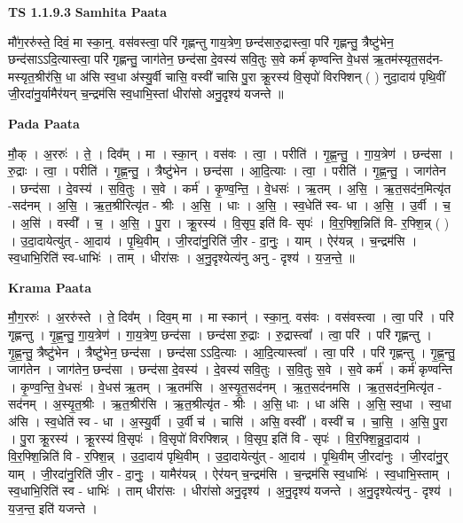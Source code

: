 \documentclass[17pt]{extarticle}
\begin{document}
\textbf{TS 1.1.9.3 } \newline
\textbf{Samhita Paata} \newline

मौ॑ग॒ररु॑स्ते॒ दिवं॒ मा स्का॒न्॒. वस॑वस्त्वा॒ परि॑ गृह्णन्तु गाय॒त्रेण॒ छन्द॑सारु॒द्रास्त्वा॒ परि॑ गृह्णन्तु॒ त्रैष्टु॑भेन॒ छन्द॑साऽऽदि॒त्यास्त्वा॒ परि॑ गृह्णन्तु॒ जाग॑तेन॒ छन्द॑सा दे॒वस्य॑ सवि॒तुः स॒वे कर्म॑ कृण्वन्ति वे॒धस॑ ऋ॒तम॑स्यृत॒सद॑न-मस्यृत॒श्रीर॑सि॒ धा अ॑सि स्व॒धा अ॑स्यु॒र्वी चासि॒ वस्वी॑ चासि पु॒रा क्रू॒रस्य॑ वि॒सृपो॑ विरफ्शिन् ( ) नुदा॒दाय॑ पृथि॒वीं जी॒रदा॑नु॒र्यामैर॑यन्  च॒न्द्रम॑सि स्व॒धाभि॒स्तां धीरा॑सो अनु॒दृश्य॑ यजन्ते ॥ \newline

\textbf{Pada Paata} \newline

मौ॒क् । अ॒ररुः॑ । ते॒ । दिव᳚म् । मा । स्का॒न् । वस॑वः । त्वा॒ । परीति॑ । गृ॒ह्ण॒न्तु॒ । गा॒य॒त्रेण॑ । छन्द॑सा । रु॒द्राः । त्वा॒ । परीति॑ । गृ॒ह्ण॒न्तु॒ । त्रैष्टु॑भेन । छन्द॑सा । आ॒दि॒त्याः । त्वा॒ । परीति॑ । गृ॒ह्ण॒न्तु॒ । जाग॑तेन । छन्द॑सा । दे॒वस्य॑ । स॒वि॒तुः । स॒वे । कर्म॑ । कृ॒ण्व॒न्ति॒ । वे॒धसः॑ । ऋ॒तम् । अ॒सि॒ । ऋ॒त॒सद॑न॒मित्यृ॑त -सद॑नम् । अ॒सि॒ । ऋ॒त॒श्रीरित्यृ॑त - श्रीः । अ॒सि॒ । धाः । अ॒सि॒ । स्व॒धेति॑ स्व- धा । अ॒सि॒ । उ॒र्वी । च॒ । अ॒सि॑ । वस्वी᳚ । च॒ । अ॒सि॒ । पु॒रा । क्रू॒रस्य॑ । वि॒सृप॒ इति॑ वि- सृपः॑ । वि॒र॒फ्शि॒न्निति॑ वि- र॒फ्शि॒न्न् ( ) । उ॒दा॒दायेत्यु॑त् - आ॒दाय॑ । पृ॒थि॒वीम् । जी॒रदा॑नु॒रिति॑ जी॒र - दा॒नुः॒ । याम् । ऐर॑यन्न् । च॒न्द्रम॑सि । स्व॒धाभि॒रिति॑ स्व-धाभिः॑ । ताम् । धीरा॑सः । अ॒नु॒दृश्येत्य॑नु अनु - दृश्य॑ । य॒ज॒न्ते॒ ॥  \newline


\textbf{Krama Paata} \newline

मौ॒ग॒ररुः॑ । अ॒ररु॑स्ते । ते॒ दिव᳚म् । दिव॒म् मा । मा स्कान्॑ । स्का॒न्॒. वस॑वः । वस॑वस्त्वा । त्वा॒ परि॑ । परि॑ गृह्णन्तु । गृ॒ह्ण॒न्तु॒ गा॒य॒त्रेण॑ । गा॒य॒त्रेण॒ छन्द॑सा । छन्द॑सा रु॒द्राः । रु॒द्रास्त्वा᳚ । त्वा॒ परि॑ । परि॑ गृह्णन्तु । गृ॒ह्ण॒न्तु॒ त्रैष्टु॑भेन । त्रैष्टु॑भेन॒ छन्द॑सा । छन्द॑सा ऽऽदि॒त्याः । आ॒दि॒त्यास्त्वा᳚ । त्वा॒ परि॑ । परि॑ गृह्णन्तु । गृ॒ह्ण॒न्तु॒ जाग॑तेन । जाग॑तेन॒ छन्द॑सा । छन्द॑सा दे॒वस्य॑ । दे॒वस्य॑ सवि॒तुः । स॒वि॒तुः स॒वे । स॒वे कर्म॑ । कर्म॑ कृण्वन्ति । कृ॒ण्व॒न्ति॒ वे॒धसः॑ । वे॒धस॑ ऋ॒तम् । ऋ॒तम॑सि । अ॒स्यृ॒त॒सद॑नम् । ऋ॒त॒सद॑नमसि । ऋ॒त॒सद॑न॒मित्यृ॑त - सद॑नम् । अ॒स्यृ॒त॒श्रीः । ऋ॒त॒श्रीर॑सि । ऋ॒त॒श्रीत्यृ॑त - श्रीः । अ॒सि॒ धाः । धा अ॑सि । अ॒सि॒ स्व॒धा । स्व॒धा अ॑सि । स्व॒धेति॑ स्व - धा । अ॒स्यु॒र्वी । उ॒र्वी च॑ । चासि॑ । असि॒ वस्वी᳚ । वस्वी॑ च । चा॒सि॒ । अ॒सि॒ पु॒रा । पु॒रा क्रू॒रस्य॑ । क्रू॒रस्य॑ वि॒सृपः॑ । वि॒सृपो॑ विरफ्शिन्न् । वि॒सृप॒ इति॑ वि - सृपः॑ । वि॒र॒फ्शि॒न्नु॒दा॒दाय॑ । वि॒र॒फ्शि॒न्निति॑ वि - र॒फ्शि॒न्न् । उ॒दा॒दाय॑ पृथि॒वीम् । उ॒दा॒दायेत्यु॑त् - आ॒दाय॑ । पृ॒थि॒वीम् जी॒रदा॑नुः । जी॒रदा॑नु॒र् याम् । जी॒रदा॑नु॒रिति॑ जी॒र - दा॒नुः॒ । यामैर॑यन्न् । ऐर॑यन् च॒न्द्रम॑सि । च॒न्द्रम॑सि स्व॒धाभिः॑ । स्व॒धाभि॒स्ताम् । स्व॒धाभि॒रिति॑ स्व - धाभिः॑ । ताम् धीरा॑सः । धीरा॑सो अनु॒दृश्य॑ । अ॒नु॒दृश्य॑ यजन्ते । अ॒नु॒दृश्येत्य॑नु - दृश्य॑ । य॒ज॒न्त॒ इति॑ यजन्ते । \newline
\end{document}
